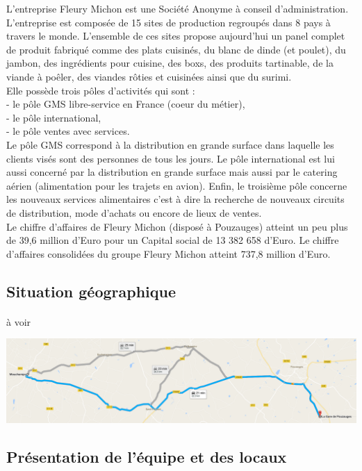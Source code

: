 \documentclass[a4paper,12pt]{extarticle}
\begin{document}
	L’entreprise Fleury Michon est une Société Anonyme à conseil d'administration. L’entreprise est composée de 15 sites de production regroupés dans 8 pays à travers le monde. L’ensemble de ces sites propose aujourd’hui un panel complet de produit fabriqué comme des plats cuisinés, du blanc de dinde (et poulet), du jambon, des ingrédients pour cuisine, des boxs, des produits tartinable, de la viande à poêler, des viandes rôties et cuisinées ainsi que du surimi.\\
Elle possède trois pôles d’activités qui sont :\\
	- le pôle GMS libre-service en France (coeur du métier),\\
	- le pôle international,\\
	- le pôle ventes avec services.\\
Le pôle GMS correspond à la distribution en grande surface dans laquelle les clients visés sont des personnes de tous les jours. Le pôle international est lui aussi concerné par la distribution en grande surface mais aussi par le catering aérien (alimentation pour les trajets en avion). Enfin, le troisième pôle concerne les nouveaux services alimentaires c’est à dire la recherche de nouveaux circuits de distribution, mode d’achats ou encore de lieux de ventes.\\
Le chiffre d’affaires de Fleury Michon (disposé à Pouzauges) atteint un peu plus de 39,6 million d’Euro pour un Capital social de 13 382 658 d’Euro. Le chiffre d’affaires consolidées du groupe Fleury Michon atteint 737,8 million d’Euro.\\

	\subsection{Situation géographique}
		\paragraph{}
			à voir\\

			\centerline{\includegraphics[scale=0.40]{Img/Img_SituationGeo}}

	\subsection{Présentation de l'équipe et des locaux}
\end{document}
